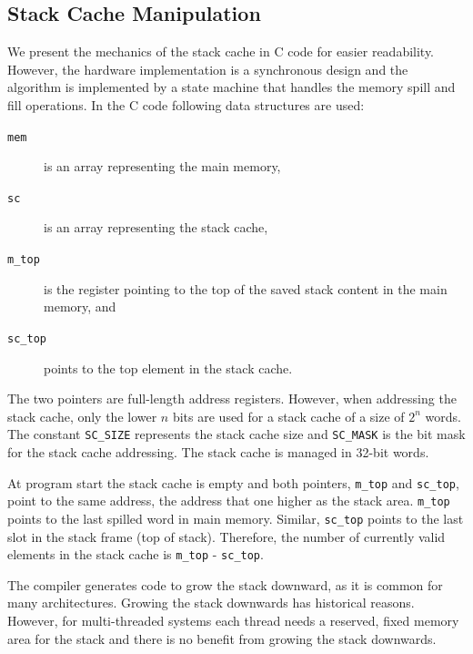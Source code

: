 \documentclass[a4paper,fontsize=10pt,twoside,DIV15,BCOR12mm,headinclude=true,footinclude=false,pagesize,bibtotoc]{scrbook}
\newcommand{\code}[1]{{\texttt{#1}}}
\begin{document}
\subsection{Stack Cache Manipulation}

We present the mechanics of the stack cache in C code for easier readability.
However, the hardware implementation is a synchronous design and
the algorithm is implemented by a state machine that handles
the memory spill and fill operations. In the C code following data structures are used:

\begin{description}
\item[\code{mem}] is an array representing the main memory,
\item[\code{sc}] is an array representing the stack cache,
\item[\code{m\_top}] is the register pointing to the top of the saved stack content in the main memory, and
\item[\code{sc\_top}] points to the top element in the stack cache.
\end{description}

The two pointers are full-length address registers. However,
when addressing the stack cache, only the lower $n$ bits
are used for a stack cache of a size of $2^n$ words.
The constant \code{SC\_SIZE} represents the stack
cache size and \code{SC\_MASK} is the bit mask for
the stack cache addressing. The stack cache is managed in 32-bit
words. %

At program start the stack cache is empty and both pointers,
\code{m\_top} and \code{sc\_top}, point to the same address,
the address that one higher as the stack area. \code{m\_top}
points to the last spilled word in main memory.
Similar, \code{sc\_top} points to the last slot in the stack
frame (top of stack). Therefore, the number of currently valid
elements in the stack cache is \code{m\_top} - \code{sc\_top}.

The compiler generates code to grow the stack downward,
as it is common for many architectures. Growing the stack downwards
has historical reasons. However, for multi-threaded
systems each thread needs a reserved, fixed memory area
for the stack and there is no benefit from growing the stack
downwards.

%
%
%
%
%
%
\end{document}
